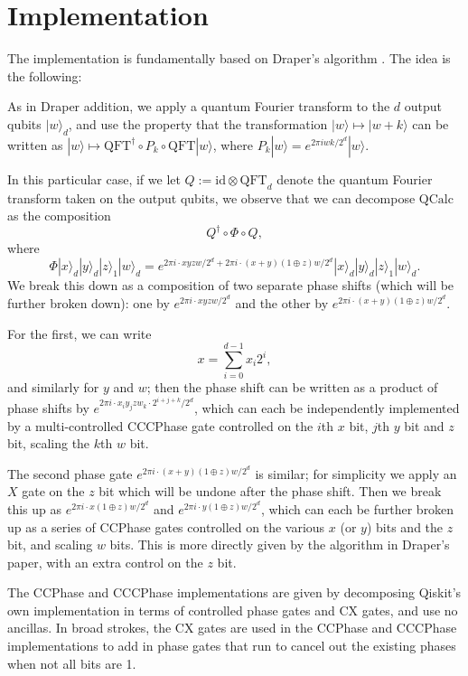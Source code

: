 \documentclass{article}
\theoremstyle{definition}
\theoremstyle{remark}
\newcommand{\braket}[1]{|#1\rangle}
\begin{document}
	\section{Implementation}
	The implementation is fundamentally based on Draper's algorithm \cite{draper}. The idea is the following: \par 
	As in Draper addition, we apply a quantum Fourier transform to the $d$ output qubits $\braket{w}_d$, and use the property that the transformation $\braket{w} \mapsto \braket{w+k}$ can be written as $\braket{w} \mapsto \mathrm{QFT}^\dagger \circ P_k \circ \mathrm{QFT} \braket{w}$, where $P_k\braket{w} = e^{2\pi i wk/2^d}\braket{w}$. \par 
	In this particular case, if we let $Q := \mathrm{id} \otimes \mathrm{QFT}_d$ denote the quantum Fourier transform taken on the output qubits, we observe that we can decompose $\mathrm{QCalc}$ as the composition 
	\[Q^\dagger \circ \Phi \circ Q,\] 
	where 
	\[\Phi\braket{x}_d\braket{y}_d\braket{z}_1\braket{w}_d = e^{2\pi i \cdot xyzw/2^d + 2\pi i\cdot(x+y)(1\oplus z)w/2^d}\braket{x}_d\braket{y}_d\braket{z}_1\braket{w}_d.\]
	We break this down as a composition of two separate phase shifts (which will be further broken down): one by $e^{2\pi i \cdot xyzw/2^d}$ and the other by $e^{2\pi i \cdot (x+y)(1\oplus z)w/2^d}$. \par 
	For the first, we can write 
	\[x = \sum_{i=0}^{d-1} x_i2^i,\]
	and similarly for $y$ and $w$; then the phase shift can be written as a product of phase shifts by $e^{2\pi i \cdot x_iy_jzw_k \cdot 2^{i+j+k}/2^d}$, which can each be independently implemented by a multi-controlled CCCPhase gate controlled on the $i$th $x$ bit, $j$th $y$ bit and $z$ bit, scaling the $k$th $w$ bit. \par 
	The second phase gate $e^{2\pi i \cdot (x+y)(1 \oplus z)w/2^d}$ is similar; for simplicity we apply an $X$ gate on the $z$ bit which will be undone after the phase shift. Then we break this up as $e^{2\pi i \cdot x(1 \oplus z)w/2^d}$ and $e^{2\pi i \cdot y(1 \oplus z )w/2^d}$, which can each be further broken up as a series of CCPhase gates controlled on the various $x$ (or $y$) bits and the $z$ bit, and scaling $w$ bits. This is more directly given by the algorithm in Draper's paper, with an extra control on the $z$ bit. \par 
	The CCPhase and CCCPhase implementations are given by decomposing Qiskit's own implementation in terms of controlled phase gates and CX gates, and use no ancillas. In broad strokes, the CX gates are used in the CCPhase and CCCPhase implementations to add in phase gates that run to cancel out the existing phases when not all bits are 1. 
\end{document}
